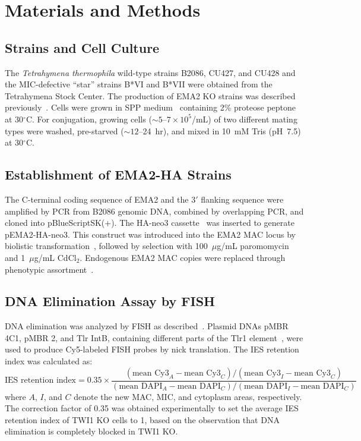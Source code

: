 \documentclass[12pt]{article}
\begin{document}
\section{Materials and Methods}

\subsection{Strains and Cell Culture}

The \textit{Tetrahymena thermophila} wild-type strains B2086, CU427, and CU428 and the MIC-defective ``star'' strains B*VI and B*VII were obtained from the Tetrahymena Stock Center.
The production of EMA2 KO strains was described previously~\citep{Shehzada2022}.
Cells were grown in SPP medium~\citep{Gorovsky1975} containing 2\% proteose peptone at 30$^{\circ}$C.
For conjugation, growing cells (${\sim}5$--$7 \times 10^{5}$/mL) of two different mating types were washed, pre-starved (${\sim}12$--24~hr), and mixed in 10~mM Tris (pH~7.5) at 30$^{\circ}$C.

\subsection{Establishment of EMA2-HA Strains}

The C-terminal coding sequence of EMA2 and the 3$'$ flanking sequence were amplified by PCR from B2086 genomic DNA, combined by overlapping PCR, and cloned into pBlueScriptSK(+).
The HA-neo3 cassette~\citep{Kataoka2010} was inserted to generate pEMA2-HA-neo3.
This construct was introduced into the EMA2 MAC locus by biolistic transformation~\citep{Bruns2000}, followed by selection with 100~$\mu$g/mL paromomycin and 1~$\mu$g/mL CdCl$_{2}$.
Endogenous EMA2 MAC copies were replaced through phenotypic assortment~\citep{Hamilton2000}.

\subsection{DNA Elimination Assay by FISH}

DNA elimination was analyzed by FISH as described~\citep{Loidl2004}.
Plasmid DNAs pMBR 4C1, pMBR 2, and Tlr IntB, containing different parts of the Tlr1 element~\citep{Wuitschick2002}, were used to produce Cy5-labeled FISH probes by nick translation.
The IES retention index was calculated as:
\begin{equation}
\text{IES retention index} = 0.35 \times \frac{(\text{mean Cy3}_A - \text{mean Cy3}_C) / (\text{mean Cy3}_I - \text{mean Cy3}_C)}{(\text{mean DAPI}_A - \text{mean DAPI}_C) / (\text{mean DAPI}_I - \text{mean DAPI}_C)}
\end{equation}
where $A$, $I$, and $C$ denote the new MAC, MIC, and cytoplasm areas, respectively.
The correction factor of 0.35 was obtained experimentally to set the average IES retention index of TWI1 KO cells to 1, based on the observation that DNA elimination is completely blocked in TWI1 KO.
\end{document}
